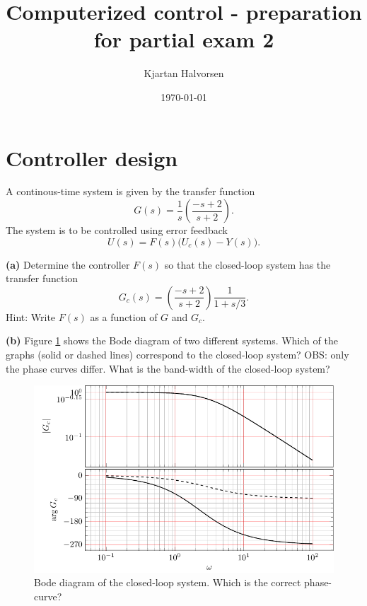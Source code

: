 \documentclass{scrartcl}
\title{Computerized control - preparation for partial exam 2}
\author{Kjartan Halvorsen}
\date{\today}
\begin{document}
\maketitle



\section{Controller design}
\label{sec-1}


  A continous-time system is given by the transfer function
  \[ G(s) = \frac{1}{s}\left(\frac{-s+2}{s+2}\right).\]
  The system is to be controlled using error feedback
  \[ U(s) = F(s) \big(U_c(s) - Y(s) \big). \]

  \textbf{(a)} Determine the controller $F(s)$ so that the closed-loop system has the transfer function
  \[G_c(s) = \left(\frac{-s+2}{s+2}\right)\frac{1}{1+s/3}. \]
  Hint: Write $F(s)$ as a function of $G$ and $G_c$. 

  \textbf{(b)} Figure \ref{fig:nonminclosed} shows the Bode diagram of two different systems. Which of the graphs (solid or dashed lines) correspond to the closed-loop system?  OBS: only the phase curves differ. What is the band-width of the closed-loop system?
  \begin{figure}
  \begin{center}
  \includegraphics[width=0.8\linewidth]{bode-nonminphase}
  \end{center}
  \caption{Bode diagram of the closed-loop system. Which is the correct phase-curve?}
  \label{fig:nonminclosed}
  \end{figure}
\end{document}
